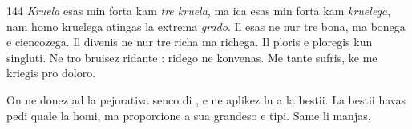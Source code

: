 \begin{VUpage}[148]{144}
\textit{Kruela} esas min forta kam \textit{tre kruela}, ma ica esas min\nl
forta kam \textit{kruelega}, nam homo kruelega atingas la extrema\nl
\textit{grado}. Il esas ne nur tre bona, ma bonega e ciencozega. Il\nl
divenis ne nur tre richa ma richega. Il ploris e ploregis kun\nl
singluti. Ne tro bruisez ridante : ridego ne konvenas. Me\nl
tante sufris, ke me kriegis pro doloro.

On ne donez ad  la pejorativa senco di , e ne\nl
aplikez lu a la bestii. La bestii havas  pedi quale la\nl
homi, ma proporcione a sua grandeso e tipi. Same li manjas,
\end{VUpage}

